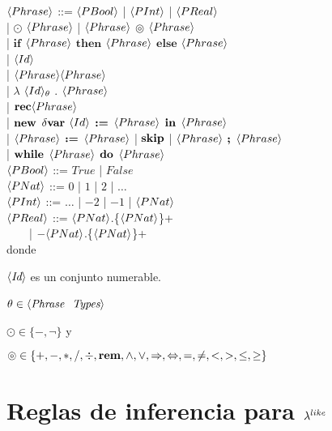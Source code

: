 \noindent
$\langle Phrase \rangle$ ::= $\langle PBool \rangle$ | $\langle PInt \rangle$ | $\langle PReal \rangle$\\
\indent \indent \indent 
| $\odot$ $\langle Phrase \rangle$ | $\langle Phrase \rangle$ $\circledcirc$ $\langle Phrase \rangle$\\
\indent \indent \indent 
| $\textbf{if}$ $\langle Phrase \rangle$ $\textbf{then}$ $\langle Phrase \rangle$ $\textbf{else}$ $\langle Phrase \rangle$\\
\indent \indent \indent 
| $\langle Id \rangle$\\
\indent \indent \indent 
| $\langle Phrase \rangle\langle Phrase \rangle$\\
\indent \indent \indent 
| $\lambda$ $\langle Id \rangle_\theta$ . $\langle Phrase \rangle$\\
\indent \indent \indent 
| $\textbf{rec} \langle Phrase \rangle$\\
\indent \indent \indent 
| $\textbf{new}$ $\delta \textbf{var}$ $\langle Id \rangle$ $\textbf{:=}$ $\langle Phrase \rangle$ $\textbf{in}$ $\langle Phrase \rangle$\\
\indent \indent \indent 
| $\langle Phrase \rangle$ $\textbf{:=}$ $\langle Phrase \rangle$ | $\textbf{skip}$ | $\langle Phrase \rangle$ $\textbf{;}$ $\langle Phrase \rangle$\\
\indent \indent \indent
| $\textbf{while}$ $\langle Phrase \rangle$ $\textbf{do}$ $\langle Phrase \rangle$\\

\noindent
$\langle PBool \rangle$ ::= $True$ | $False$\\

\noindent
$\langle PNat \rangle$ ::= $0$ | $1$ | $2$ | $\ldots$\\

\noindent
$\langle PInt \rangle$ ::= $\ldots$ | $-2$ | $-1$ | $\langle PNat \rangle$\\

\noindent
$\langle PReal \rangle$ ::= $\langle PNat \rangle$.\{$\langle PNat \rangle$\}+\\
\indent \indent \ \ \ \
| $- \langle PNat \rangle$.\{$\langle PNat \rangle$\}+\\

\noindent
donde \ 

$\langle \textit{Id} \rangle$ es un conjunto numerable.

$\theta \in \langle \textit{Phrase \ Types} \rangle$ \

$\odot \in \{-, \neg\}$ y \

$\circledcirc \in \{+,-,*,/,\div,\textbf{rem},\wedge,\vee,\Rightarrow,\Leftrightarrow, =,\neq,<,>,\leq,\geq\}$

\section{Reglas de inferencia para $\lambda^{like}$}


